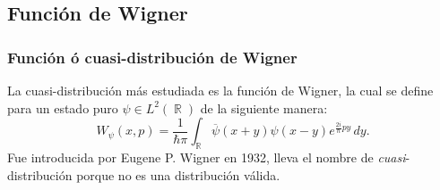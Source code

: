\documentclass[10pt, spanish]{beamer}
\DeclareMathOperator{\R}{\mathbb{R}}
\DeclareMathOperator{\Tr}{Tr}
\begin{document}




  \subsection{Función de Wigner}

  \begin{frame}
    \frametitle{Función ó cuasi-distribución de Wigner}

    La cuasi-distribución más estudiada es la función de
    Wigner, la cual se define para un estado puro $\psi \in
    L^2(\R)$ de la siguiente manera:
    \begin{equation}
      W_\psi(x,p)
      = \frac{1}{\hbar \pi} \int_{\R}
      \overline{\psi}(x+y) \psi(x-y)
      e^{\frac{2i}{\hbar} p y } \, dy.
    \end{equation}
    Fue introducida por Eugene P. Wigner en 1932, lleva el
    nombre de \textit{cuasi}-distribución porque no es una
    distribución válida.
  \end{frame}
\end{document}
